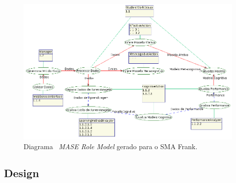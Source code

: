 \begin{figure}
	\centering
	\includegraphics[scale=0.48]{images/mase-role-model.png}
	\caption{Diagrama ~\emph{MASE Role Model} gerado para o SMA Frank.}
	\label{fig:dss-uc5-fluxo-principal}
\end{figure}







\subsection{Design}\label{subsection:design}
